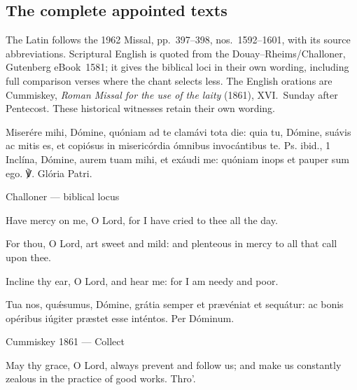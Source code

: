 \subsection*{The complete appointed texts}

The Latin follows the 1962 Missal, pp.~397--398, nos.~1592--1601, with its source abbreviations. Scriptural English is quoted from the Douay--Rheims/Challoner, Gutenberg eBook~1581; it gives the biblical loci in their own wording, including full comparison verses where the chant selects less. The English orations are Cummiskey, \textit{Roman Missal for the use of the laity} (1861), XVI.~Sunday after Pentecost. These historical witnesses retain their own wording.



Miserére mihi, Dómine, quóniam ad te clamávi tota die: quia tu, Dómine,
suávis ac mitis es, et copiósus in misericórdia ómnibus invocántibus te.
Ps. ibid., 1 Inclína, Dómine, aurem tuam mihi, et exáudi me: quóniam inops
et pauper sum ego. ℣. Glória Patri.

\finishfulltextelement

\begin{fulltextenglish}{Challoner --- biblical locus}

Have mercy on me, O Lord, for I have cried to thee all the day.

For thou, O Lord, art sweet and mild: and plenteous in mercy to all that call upon thee.

Incline thy ear, O Lord, and hear me: for I am needy and poor.

\end{fulltextenglish}



Tua nos, quǽsumus, Dómine, grátia semper et prævéniat et sequátur: ac
bonis opéribus iúgiter præstet esse inténtos. Per Dóminum.

\finishfulltextelement

\begin{fulltextenglish}{Cummiskey 1861 --- Collect}

May thy grace, O Lord, always prevent and follow us; and make us constantly zealous in the practice of good works. Thro’.

\end{fulltextenglish}

